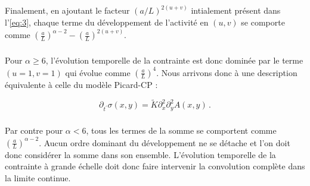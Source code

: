 \noindent Finalement, en ajoutant le facteur $(a/L)^{2(u+v)}$ intialement présent dans l'\autoref{eq:3}, chaque terme du développement de l'activité en $(u,v)$ se comporte comme $\left(\frac{a}{L}\right)^{\alpha-2}-\left( \frac{a}{L} \right)^{2(u+v)}$.

\subparagraph{}Pour $\alpha \geq 6$, l'évolution temporelle de la contrainte est donc dominée par le terme $(u=1,v=1)$ qui évolue comme $\left( \frac{a}{L} \right)^4$. Nous arrivons donc à une description équivalente à celle du modèle Picard-CP :

\begin{equation}
    \partial_{t^\prime}\sigma (x,y) = \tilde{K}\partial_x^{2}\partial_y^{2}A(x, y)\, .
    \label{eq:evol:sigma:Classa6}
\end{equation}

\subparagraph{}Par contre pour $\alpha < 6$, tous les termes de la somme se comportent comme $\left( \frac{a}{L} \right)^{\alpha-2}$. Aucun ordre dominant du développement ne se détache et l'on doit donc considérer la somme dans son ensemble. L'évolution temporelle de la contrainte à grande échelle doit donc faire intervenir la convolution complète dans la limite continue.

